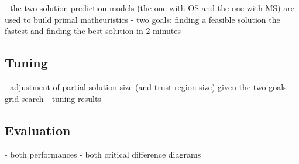 - the two solution prediction models (the one with OS and the one with MS) are used to build primal matheuristics
- two goals: finding a feasible solution the fastest and finding the best solution in 2 minutes

\subsection{Tuning}

- adjustment of partial solution size (and trust region size) given the two goals
- grid search
- tuning results

\subsection{Evaluation}

- both performances
- both critical difference diagrams

